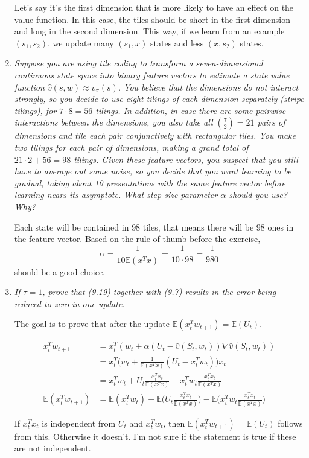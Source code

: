 \documentclass[12pt,a4paper]{article}
\begin{document}
\begin{enumerate}
  Let's say it's the first dimension that is more likely to have an effect on the value
  function. In this case, the tiles should be short in the first dimension and long in
  the second dimension. This way, if we learn from an example $(s_1, s_2)$, we update
  many $(s_1, x)$ states and less $(x, s_2)$ states.

  \item \textit{Suppose you are using tile coding to transform a seven-dimensional continuous
  state space into binary feature vectors to estimate a state value function
  $\hat{v}(s,w) \approx v_\pi(s)$. You believe that the dimensions do not interact strongly,
  so you decide to use eight tilings of each dimension separately (stripe tilings), for 
  $7 \cdot 8 = 56$ tilings. In addition, in case there are some pairwise interactions between
  the dimensions, you also take all $\binom{7}{2} = 21$ pairs of dimensions and tile each
  pair conjunctively with rectangular tiles. You make two tilings for each pair of dimensions,
  making a grand total of $21 \cdot 2 + 56 = 98$ tilings. Given these feature vectors, you suspect
  that you still have to average out some noise, so you decide that you want learning to be
  gradual, taking about 10 presentations with the same feature vector before learning nears
  its asymptote. What step-size parameter $\alpha$ should you use? Why?}

  Each state will be contained in $98$ tiles, that means there will be $98$ ones in the feature vector.
  Based on the rule of thumb before the exercise,
  \[\alpha = \frac{1}{10 \mathbb{E}(x^Tx)} = \frac{1}{10 \cdot 98} = \frac{1}{980}\]
  should be a good choice.

  \item \textit{If $\tau = 1$, prove that (9.19) together with (9.7) results in the error being
  reduced to zero in one update.}

  The goal is to prove that after the update $\mathbb{E}(x_t^Tw_{t + 1}) = \mathbb{E}(U_t)$.

  \begin{align*}
    x_t^T w_{t + 1} &= x_t^T(w_t + \alpha(U_t - \hat{v}(S_t, w_t)) \nabla \hat{v}(S_t, w_t))\\
    &= x_t^T\Big(w_t + \frac{1}{\mathbb{E}(x^Tx)} (U_t - x_t^T w_t)\Big)x_t\\
    &= x_t^T w_t + U_t\frac{x_t^T x_t}{\mathbb{E}(x^Tx)} - x_t^T w_t \frac{x_t^T x_t}{\mathbb{E}(x^Tx)}\\
    \mathbb{E}(x_t^T w_{t + 1}) &= \mathbb{E}(x_t^T w_t)
    + \mathbb{E}\Big(U_t\frac{x_t^T x_t}{\mathbb{E}(x^Tx)}\Big)
    - \mathbb{E}\Big(x_t^T w_t \frac{x_t^T x_t}{\mathbb{E}(x^Tx)}\Big)
  \end{align*}

  If $x_t^T x_t$ is independent from $U_t$ and $x_t^Tw_t$, then $\mathbb{E}(x_t^Tw_{t + 1}) = \mathbb{E}(U_t)$
  follows from this. Otherwise it doesn't. I'm not sure if the statement is true if
  these are not independent.

\end{enumerate}
\end{document}
